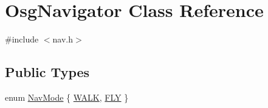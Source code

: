 \hypertarget{class_osg_navigator}{
\section{OsgNavigator Class Reference}
\label{class_osg_navigator}
}


{\ttfamily \#include $<$nav.h$>$}\subsection*{Public Types}
\begin{DoxyCompactItemize}
\item 
enum \hyperlink{class_osg_navigator_af7e369e107a95154084e59e0a85aa18f}{NavMode} \{ \hyperlink{class_osg_navigator_af7e369e107a95154084e59e0a85aa18fa6edd2fe6c30ecc32e3c6b77859995aa9}{WALK}, 
\hyperlink{class_osg_navigator_af7e369e107a95154084e59e0a85aa18fae4421b45468d2b0612d2b33eed264f64}{FLY}
 \}
\end{DoxyCompactItemize}
